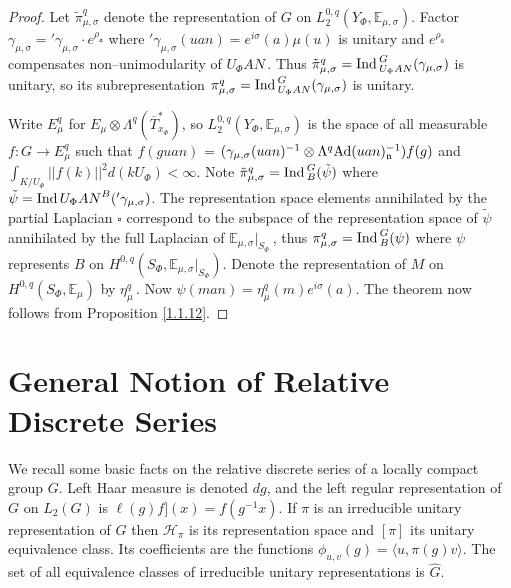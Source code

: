 \documentclass{conm-p-l}
\def\ga{\mathfrak{a}}
\def\gn{\mathfrak{n}}
\def\Ad{{\rm Ad}}
\def\Ind{{\rm Ind\,}}
\def\E{\mathbb{E}}
\def\cH{\mathcal{H}}
\begin{document}
\begin{proof} Let $\tilde \pi_{\mu,\sigma}^{q}$ denote the representation
of $G$ on $L_2^{0,q}(Y_\Phi,\E_{\mu,\sigma})$.  Factor $\gamma_{\mu,\sigma} = 
{}' \gamma_{\mu,\sigma}\cdot e^{\rho_\ga}$ where
${}' \gamma_{\mu,\sigma}(uan) = e^{i\sigma}(a)\mu(u)$ is unitary and
$e^{\rho_a}$ compensates non--unimodularity of $U_\Phi AN$\,.  
Thus $\tilde \pi_{\mu,\sigma}^{q} = \Ind_{U_\Phi AN}^G(\gamma_{\mu,\sigma})$
is unitary, so its subrepresentation 
$\pi_{\mu,\sigma}^{q} = \Ind_{U_\Phi AN}^G(\gamma_{\mu,\sigma})$ is unitary.

Write $E_\mu^q$ for $E_\mu\otimes\Lambda^q(\overline{T}_{x_\Phi}^*)$,
so $L_2^{0,q}(Y_\Phi,\E_{\mu,\sigma})$ is the space of all measurable
$f:G \to E_\mu^q$ such that $f(guan)$ = $(\gamma_{\mu,\sigma}(uan)^{-1}
\otimes \Lambda^q\Ad(uan)_\gn^{-1})f(g)$ and 
$\int_{K/U_\Phi}||f(k)||^2 d(kU_\Phi) < \infty$.  Note 
$\tilde \pi_{\mu,\sigma}^{q} = \Ind_B^G(\tilde \psi)$ where $\tilde \psi
= \Ind{U_\Phi AN}^B('\gamma_{\mu,\sigma})$.  The representation space
elements annihilated by the partial Laplacian $\square$ correspond to the
subspace of the representation space of $\tilde \psi$ annihilated by the
full Laplacian of $\E_{\mu,\sigma}|_{S_\Phi}$\,, thus
$\pi_{\mu,\sigma}^q = \Ind_B^G(\psi)$ where $\psi$ represents $B$ on
$H^{0,q}(S_\Phi,\E_{\mu,\sigma}|_{S_\Phi})$.  Denote the
representation of $M$ on $H^{0,q}(S_\Phi,\E_\mu)$ by $\eta_\mu^q$\,.  Now
$\psi(man) = \eta_\mu^q(m)e^{i\sigma}(a)$.  The theorem now follows from
Proposition \ref{1.1.12}.
\end{proof}

\section{General Notion of Relative Discrete Series}\label{sec2}
\setcounter{equation}{0}

We recall some basic facts on the relative discrete series of a locally compact
group $G$.  Left Haar measure is denoted $dg$, and the left regular
representation of $G$ on $L_2(G)$ is $\ell(g)f](x) = f(g^{-1}x)$.  If $\pi$
is an irreducible unitary representation of $G$ then
$\cH_\pi$ is its representation space and $[\pi]$ its unitary equivalence class.
Its coefficients are the functions $\phi_{u,v}(g) = \langle u, \pi(g)v\rangle$.
The set of all equivalence classes of irreducible unitary representations
is $\widehat{G}$.
\end{document}
